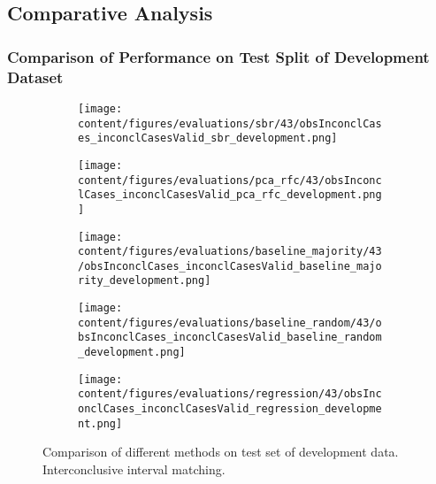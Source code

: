 \subsection{Comparative Analysis}
\label{subsec:compar_anal}


\subsubsection{Comparison of Performance on Test Split of Development Dataset}
\label{subsubsec:perf_comp_dev}


\begin{figure}[t]
  \begin{subfigure}{0.5\textwidth}
    \centering
    \texttt{[image: content/figures/evaluations/sbr/43/obsInconclCases\_inconclCasesValid\_sbr\_development.png]}
  \end{subfigure}
  \hfill
  \begin{subfigure}{0.5\textwidth}
    \centering
    \texttt{[image: content/figures/evaluations/pca\_rfc/43/obsInconclCases\_inconclCasesValid\_pca\_rfc\_development.png]}
  \end{subfigure}
  \hfill
  \begin{subfigure}{0.5\textwidth}
    \centering
    \texttt{[image: content/figures/evaluations/baseline\_majority/43/obsInconclCases\_inconclCasesValid\_baseline\_majority\_development.png]}
  \end{subfigure}
  \hfill
  \begin{subfigure}{0.5\textwidth}
    \centering
    \texttt{[image: content/figures/evaluations/baseline\_random/43/obsInconclCases\_inconclCasesValid\_baseline\_random\_development.png]}
  \end{subfigure}
  \hfill
  \begin{subfigure}{0.5\textwidth}
    \centering
    \texttt{[image: content/figures/evaluations/regression/43/obsInconclCases\_inconclCasesValid\_regression\_development.png]}
  \end{subfigure}

  \caption{Comparison of different methods on test set of development data. Interconclusive interval matching.}
  \label{fig:test_interval_match_dev}
\end{figure}

